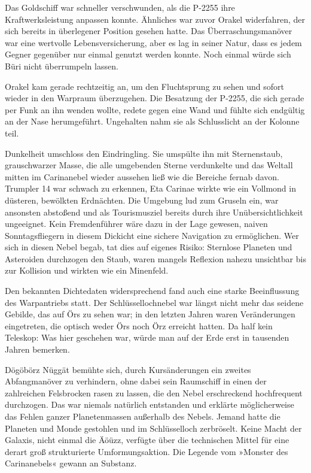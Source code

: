 Das Goldschiff war schneller verschwunden, als die P-2255 ihre Kraftwerksleistung anpassen konnte. Ähnliches war zuvor Orakel widerfahren, der sich bereits in überlegener Position gesehen hatte. Das Überraschungsmanöver war eine wertvolle Lebensversicherung, aber es lag in seiner Natur, dass es jedem Gegner gegenüber nur einmal genutzt werden konnte. Noch einmal würde sich Büri nicht überrumpeln lassen.

Orakel kam gerade rechtzeitig an, um den Fluchtsprung zu sehen und sofort wieder in den Warpraum überzugehen. Die Besatzung der P-2255, die sich gerade per Funk an ihn wenden wollte, redete gegen eine Wand und fühlte sich endgültig an der Nase herumgeführt. Ungehalten nahm sie als Schlusslicht an der Kolonne teil.

\cleardoubleevenpage



Dunkelheit umschloss den Eindringling. Sie umspülte ihn mit Sternenstaub, grauschwarzer Masse, die alle umgebenden Sterne verdunkelte und das Weltall mitten im Carinanebel wieder aussehen ließ wie die Bereiche fernab davon. Trumpler 14 war schwach zu erkennen, Eta Carinae wirkte wie ein Vollmond in düsteren, bewölkten Erdnächten. Die Umgebung lud zum Gruseln ein, war ansonsten abstoßend und als Tourismusziel bereits durch ihre Unübersichtlichkeit ungeeignet. Kein Fremdenführer wäre dazu in der Lage gewesen, naiven Sonntagsfliegern in diesem Dickicht eine sichere Navigation zu ermöglichen. Wer sich in diesen Nebel begab, tat dies auf eigenes Risiko: Sternlose Planeten und Asteroiden durchzogen den Staub, waren mangels Reflexion nahezu unsichtbar bis zur Kollision und wirkten wie ein Minenfeld.

Den bekannten Dichtedaten widersprechend fand auch eine starke Beeinflussung des Warpantriebs statt. Der Schlüssellochnebel war längst nicht mehr das seidene Gebilde, das auf Örs zu sehen war; in den letzten Jahren waren Veränderungen eingetreten, die optisch weder Örs noch Örz erreicht hatten. Da half kein Teleskop: Was hier geschehen war, würde man auf der Erde erst in tausenden Jahren bemerken.

Dögöbörz Nüggät bemühte sich, durch Kursänderungen ein zweites Abfangmanöver zu verhindern, ohne dabei sein Raumschiff in einen der zahlreichen Felsbrocken rasen zu lassen, die den Nebel erschreckend hochfrequent durchzogen. Das war niemals natürlich entstanden und erklärte möglicherweise das Fehlen ganzer Planetenmassen außerhalb des Nebels. Jemand hatte die Planeten und Monde gestohlen und im Schlüsselloch zerbröselt. Keine Macht der Galaxis, nicht einmal die Äöüzz, verfügte über die technischen Mittel für eine derart groß strukturierte Umformungsaktion. Die Legende vom »Monster des Carinanebels« gewann an Substanz.

